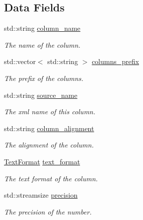 \subsection*{Data Fields}
\begin{DoxyCompactItemize}
\item 
std\+::string \hyperlink{classTranslator_1_1LatexColumnFormat_a10ec471e1bb082b3001b3efb0ad6497c}{column\+\_\+name}
\begin{DoxyCompactList}\small\item\em The name of the column. \end{DoxyCompactList}\item 
std\+::vector$<$ std\+::string $>$ \hyperlink{classTranslator_1_1LatexColumnFormat_a2a82657fe0f4e71dd9945bc6c5bfc53d}{columns\+\_\+prefix}
\begin{DoxyCompactList}\small\item\em The prefix of the columns. \end{DoxyCompactList}\item 
std\+::string \hyperlink{classTranslator_1_1LatexColumnFormat_a42670e56493331d9ec3bdad1ea71b7c0}{source\+\_\+name}
\begin{DoxyCompactList}\small\item\em The xml name of this column. \end{DoxyCompactList}\item 
std\+::string \hyperlink{classTranslator_1_1LatexColumnFormat_afb2d7e3f12a65981d09f68f83f140104}{column\+\_\+alignment}
\begin{DoxyCompactList}\small\item\em The alignment of the column. \end{DoxyCompactList}\item 
\hyperlink{classTranslator_1_1LatexColumnFormat_a3e57341308ef433ca03cb41faa3e6c00}{Text\+Format} \hyperlink{classTranslator_1_1LatexColumnFormat_ac0131296c9e8837fbcc265bc6ac8dc60}{text\+\_\+format}
\begin{DoxyCompactList}\small\item\em The text format of the column. \end{DoxyCompactList}\item 
std\+::streamsize \hyperlink{classTranslator_1_1LatexColumnFormat_adeb95b0be6d9473d4d8118fa92f98d49}{precision}
\begin{DoxyCompactList}\small\item\em The precision of the number. \end{DoxyCompactList}\item 

\end{DoxyCompactItemize}
